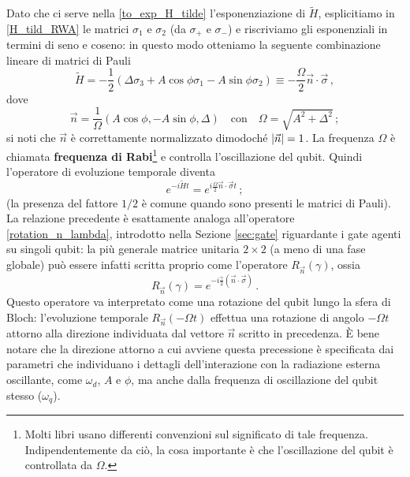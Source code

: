 \noindent Dato che ci serve nella \eqref{to_exp_H_tilde} l'esponenziazione di $\tilde{H}$, esplicitiamo in \eqref{H_tild_RWA} le matrici $\sigma_1$ e $\sigma_2$ (da $\sigma_+$ e $\sigma_-$) e riscriviamo gli esponenziali in termini di seno e coseno: in questo modo otteniamo la seguente combinazione lineare di matrici di Pauli
\begin{equation*}
    \tilde{H} = - \frac{1}{2} \left( \Delta \sigma_3 + A \cos \phi \sigma_1 - A \sin \phi \sigma_2 \right) \equiv -\frac{\Omega}{2} \vec n \cdot \vec \sigma \, ,
\end{equation*}
dove 
\begin{equation}\label{n_dir}
    \vec n = \frac{1}{\Omega} (A \cos \phi, - A \sin \phi, \Delta) \quad \text{con} \quad \Omega = \sqrt{A^2 + \Delta^2} \, ;
\end{equation}
si noti che $\vec n$ è correttamente normalizzato dimodoché $\abs{\vec n} = 1$. La frequenza $\Omega$ è chiamata \textbf{frequenza di Rabi}\footnote{Molti libri usano differenti convenzioni sul significato di tale frequenza. Indipendentemente da ciò, la cosa importante è che l'oscillazione del qubit è controllata da $\Omega$.} e controlla l'oscillazione del qubit. Quindi l'operatore di evoluzione temporale diventa 
\begin{equation}\label{rotation_Omega}
    e^{-i \tilde{H} t} = e^{i \frac{\Omega}{2} \vec n \cdot \vec \sigma t} \, ;
\end{equation}
(la presenza del fattore $1/2$ è comune quando sono presenti le matrici di Pauli). La relazione precedente è esattamente analoga all'operatore \eqref{rotation_n_lambda}, introdotto nella Sezione \ref{sec:gate} riguardante i gate agenti su singoli qubit: la più generale matrice unitaria $2 \times 2$ (a meno di una fase globale) può essere infatti scritta proprio come l'operatore $R_{\vec n}(\gamma)$, ossia
\begin{equation*}
    R_{\vec{n}}(\gamma) = e^{-i \frac{\gamma}{2} (\vec n \cdot \vec \sigma)} \, .
\end{equation*}
Questo operatore va interpretato come una rotazione del qubit lungo la sfera di Bloch: l'evoluzione temporale $R_{\vec n}(- \Omega t)$ effettua una rotazione di angolo $-\Omega t$ attorno alla direzione individuata dal vettore $\vec n$ scritto in precedenza. È bene notare che la direzione attorno a cui avviene questa precessione è specificata dai parametri che individuano i dettagli dell'interazione con la radiazione esterna oscillante, come $\omega_d$, $A$ e $\phi$, ma anche dalla frequenza di oscillazione del qubit stesso ($\omega_q$).  

